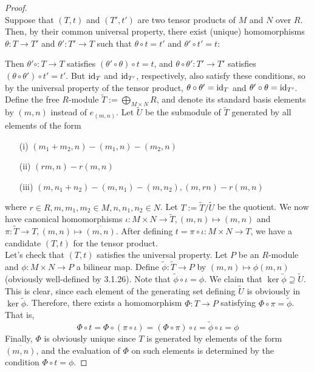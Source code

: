 \documentclass[11pt]{book}
\theoremstyle{definition}   \newtheorem{defn}[counter]{Definition} %
\newcommand{\ov}{\overline}   \newcommand{\wt}{\widetilde}
\DeclareMathOperator{\ra}{\rightarrow}   \DeclareMathOperator{\Poly}{\mathbf{P}}   \DeclareMathOperator{\spn}{\textnormal{span}}   \DeclareMathOperator{\aut}{\textnormal{Aut}}
\numberwithin{counter}{chapter}
\begin{document}
\begin{proof}\ \\
\noindent {} Suppose that $(T,t)$ and $(T',t')$ are two tensor products of $M$ and $N$ over $R$. Then, by their common universal property, there exist (unique) homomorphisms $\theta : T \ra T'$ and $\theta' : T' \ra T$ such that $\theta \circ t = t'$ and $\theta' \circ t' = t$:

Then $\theta' \circ : T \ra T$ satisfies $(\theta' \circ \theta) \circ t = t$, and $\theta \circ \theta' : T' \ra T'$ satisfies $(\theta \circ \theta') \circ t' = t'$. But $\textnormal{id}_T$ and $\textnormal{id}_{T'}$, respectively, also satisfy these conditions, so by the universal property of the tensor product, $\theta \circ \theta' = \textnormal{id}_T$ and $\theta' \circ \theta = \textnormal{id}_{T'}$. \\

\noindent {} Define the free $R$-module $\wt{T} := \bigoplus_{M \times N} R$, and denote its standard basis elements by $(m,n)$ instead of $e_{(m,n)}$. Let $\wt{U}$ be the submodule of $\wt{T}$ generated by all elements of the form
\begin{enumerate} 
\item[(i)] $(m_1+m_2,n) - (m_1,n) - (m_2,n)$
\item[(ii)] $ (rm,n) - r(m,n)$ 
\item[(iii)] $ (m,n_1+n_2) - (m,n_1)-(m,n_2), (m,rn)-r(m,n) $
\end{enumerate}
where $r \in R, m,m_1,m_2 \in M, n,n_1,n_2 \in N$. Let $T := \wt{T}/\wt{U}$ be the quotient. We now have canonical homomorphisms $\iota : M \times N \ra \wt{T}, (m,n) \mapsto (m,n)$ and $\pi : \wt{T} \ra T, (m,n) \mapsto \ov{(m,n)}$. After defining $t = \pi \circ \iota : M \times N \ra T$, we have a candidate $(T,t)$ for the tensor product. \\

Let's check that $(T,t)$ satisfies the universal property. Let $P$ be an $R$-module and $\phi : M \times N \ra P$ a bilinear map. Define $\wt{\phi} : \wt{T} \ra P$ by $(m,n) \mapsto \phi(m,n)$ (obviously well-defined by 3.1.26). Note that $\wt{\phi} \circ \iota = \phi$. We claim that $\ker \wt{\phi} \supseteq \wt{U}$. This is clear, since each element of the generating set defining $\wt{U}$ is obviously in $\ker \wt{\phi}$. Therefore, there exists a homomorphism $\Phi : T \ra P$ satisfying $\Phi \circ \pi = \wt{\phi}$. That is,
	\[\Phi \circ t = \Phi \circ (\pi \circ \iota) = (\Phi \circ \pi) \circ \iota = \wt{\phi} \circ \iota = \phi \]
Finally, $\Phi$ is obviously unique since $T$ is generated by elements of the form $\ov{(m,n)}$, and the evaluation of $\Phi$ on such elements is determined by the condition $\Phi \circ t = \phi$. 
\end{proof}
\end{document}
